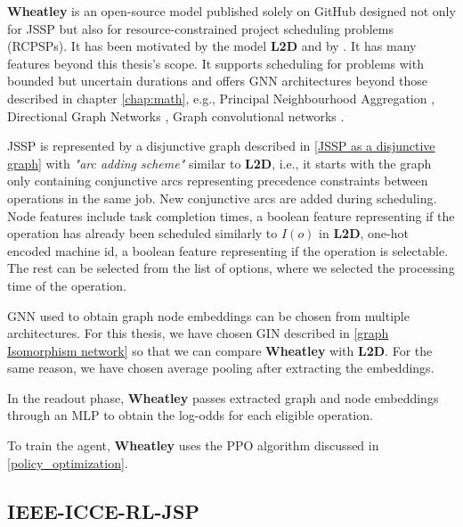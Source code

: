 \textbf{Wheatley} is an open-source model published solely on GitHub \cite{github_wheatley} designed not only for JSSP but also for resource-constrained project scheduling problems (RCPSPs). It has been motivated by the model \textbf{L2D} and by \cite{DBLP:journals/corr/abs-2104-03760}. It has many features beyond this thesis's scope. It supports scheduling for problems with bounded but uncertain durations and offers GNN architectures beyond those described in chapter \ref{chap:math}, e.g., Principal Neighbourhood Aggregation \cite{DBLP:journals/corr/abs-2004-05718}, Directional Graph Networks \cite{DBLP:journals/corr/abs-2010-02863}, Graph convolutional networks \cite{DBLP:journals/corr/abs-2007-02133}.
\par
JSSP is represented by a disjunctive graph described in \ref{JSSP as a disjunctive graph} with \textit{"arc adding scheme"} similar to \textbf{L2D}, i.e., it starts with the graph only containing conjunctive arcs representing precedence constraints between operations in the same job. New conjunctive arcs are added during scheduling. Node features include task completion times, a boolean feature representing if the operation has already been scheduled similarly to $I(o)$ in \textbf{L2D}, one-hot encoded machine id, a boolean feature representing if the operation is selectable. The rest can be selected from the list of options, where we selected the processing time of the operation.
\par
GNN used to obtain graph node embeddings can be chosen from multiple architectures. For this thesis, we have chosen GIN described in \ref{graph Isomorphism network} so that we can compare \textbf{Wheatley} with \textbf{L2D}. For the same reason, we have chosen average pooling after extracting the embeddings.
\par
In the readout phase, \textbf{Wheatley} passes extracted graph and node embeddings through an MLP to obtain the log-odds for each eligible operation.
\par
To train the agent, \textbf{Wheatley} uses the PPO algorithm discussed in \ref{policy_optimization}.

\subsection{IEEE-ICCE-RL-JSP}

